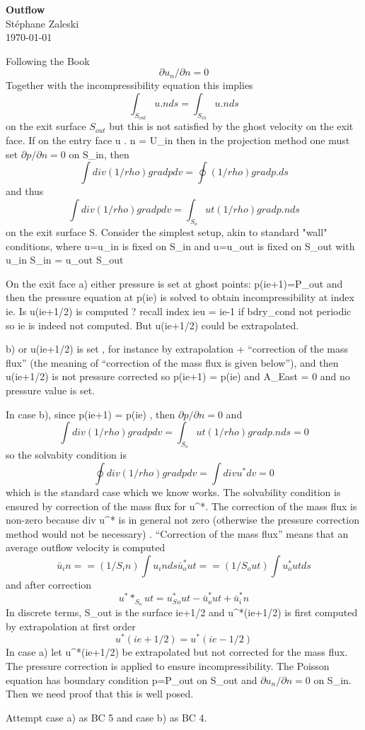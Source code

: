 \documentclass[11pt,a4paper]{article}
\begin{document}
\titlepage
\mbox{}
\begin{center}
\vskip 1cm
{\Large \bf Outflow
}\\\vskip 1cm
Stéphane Zaleski\\
\vskip 0.5cm
\today
\end{center}

Following the Book
$$
\partial u_n / \partial n = 0 
$$ 
Together with the incompressibility equation this implies
$$
\int_{S_{out}} u . n ds = \int_{S_{in}} u . n ds 
$$
on the exit surface $S_{out}$ but this is not satisfied by the ghost velocity on the exit face. 
If on the entry face u . n = U_in then in the projection method
one must set $\partial p / \partial n = 0$ on S_in, then 
$$
\int div (1/rho) grad p dv = \oint  (1/rho) grad p . ds
$$
and thus 
$$
\int div (1/rho) grad p dv = \int_S_out  (1/rho) grad p . n ds
$$
on the exit surface S.
Consider the simplest setup, akin to standard "wall" conditions, where
u=u_in is fixed on S_in and u=u_out is fixed on S_out with u_in S_in =
u_out S_out

On the exit face
a) either pressure is set at ghost points: p(ie+1)=P_out and then the
pressure equation at p(ie) is solved to obtain incompressibility at
index ie. Is u(ie+1/2) is computed ? recall index ieu = ie-1 if bdry_cond
 not periodic so ie is indeed not computed. But u(ie+1/2) could be extrapolated.

b) or u(ie+1/2) is set , for instance by extrapolation +
``correction of the mass flux'' (the meaning of ``correction of the mass
flux is given below''), and then u(ie+1/2) is not pressure corrected so
p(ie+1) = p(ie) and A_East = 0 and no pressure value is set. 

In case b), since p(ie+1) = p(ie) , then $\partial p / \partial n = 0$ and 
$$
\int div (1/rho) grad p dv = \int_S_out (1/rho) grad p . n ds = 0 
$$
so the solvabity condition is 
$$
\oint div (1/rho) grad p dv = \int div u^* dv = 0 
$$
which is the standard case which we know works. The solvability condition  is
ensured by correction of the mass flux for u^*. The correction of the mass flux is non-zero 
because div u^* is in general not zero (otherwise the pressure correction method
would not be necessary) . ``Correction of the mass flux'' means that an average outflow
velocity is computed
$$
\bar u_in = = (1/S_in) \int u_in ds
\bar u^*_out = = (1/S_out) \int u^*_out ds
$$
and after correction
$$
u^**_S_out = u^*_S_out - \bar u^*_out + \bar u^*_in
$$
In discrete terms, S_out is the surface ie+1/2 and u^*(ie+1/2) is first computed by 
extrapolation at first order
$$
 u^*(ie+1/2) =  u^*(ie-1/2) 
$$
In case a) let u^*(ie+1/2) be extrapolated but not corrected for the mass flux. 
The pressure correction is applied  to ensure incompressibility. The Poisson equation
has boundary condition p=P_out on S_out and $\partial u_n / \partial n = 0$
on S_in. Then we need proof that this is well posed. 

Attempt case a) as BC 5 and case b) as BC 4. 
\end{document}
